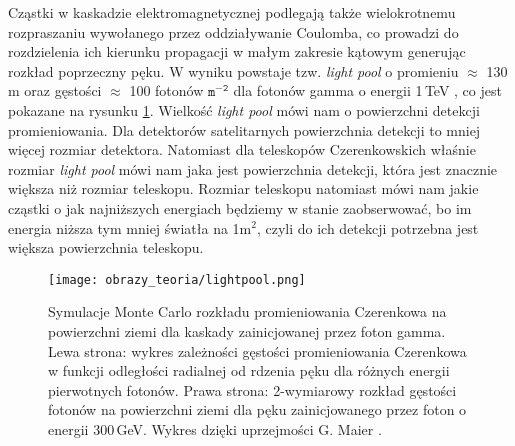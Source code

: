 \documentclass[a4paper,11pt,twoside]{article}
\begin{document}
Cząstki w kaskadzie elektromagnetycznej podlegają także wielokrotnemu rozpraszaniu wywołanego przez oddziaływanie Coulomba, co prowadzi do rozdzielenia ich kierunku propagacji w małym zakresie kątowym generując rozkład poprzeczny pęku. W wyniku powstaje tzw. \textsl{light pool} o promieniu $\approx$ 130\,m oraz gęstości $\approx$ 100 fotonów $\mathtt{m^{-2}}$ dla fotonów gamma o energii 1\,TeV \cite{IACT}, co jest pokazane na rysunku \ref{fig:lightpool}. Wielkość \textsl{light pool} mówi nam o powierzchni detekcji promieniowania. Dla detektorów satelitarnych powierzchnia detekcji to mniej więcej rozmiar detektora. Natomiast dla teleskopów Czerenkowskich właśnie rozmiar \textsl{light pool} mówi nam jaka jest powierzchnia detekcji, która jest znacznie większa niż rozmiar teleskopu. Rozmiar teleskopu natomiast mówi nam jakie cząstki o jak najniższych energiach będziemy w stanie zaobserwować, bo im energia niższa tym mniej światła na 1m$^2$, czyli do ich detekcji potrzebna jest większa powierzchnia teleskopu. 
\begin{figure}[H] 
\centering
\texttt{[image: obrazy\_teoria/lightpool.png]}
\caption{Symulacje Monte Carlo rozkładu promieniowania Czerenkowa na powierzchni ziemi dla kaskady zainicjowanej przez foton gamma. Lewa strona: wykres zależności gęstości promieniowania Czerenkowa w funkcji odległości radialnej od rdzenia pęku dla różnych energii pierwotnych fotonów. Prawa strona: 2-wymiarowy rozkład gęstości fotonów na powierzchni ziemi dla pęku zainicjowanego przez foton o energii 300\,GeV. Wykres dzięki uprzejmości G. Maier \cite{IACT}.}
\label{fig:lightpool}
\end{figure}
\newpage
\end{document}

